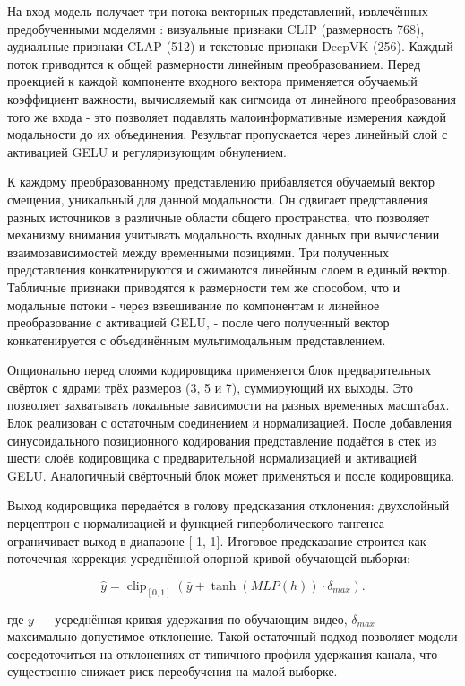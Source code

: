 \documentclass[times]{itmo-student-thesis}
\begin{document}
На вход модель получает три потока векторных представлений, извлечённых предобученными моделями \cite{radford2021clip,tong2022videomae,deepvk2024user}: визуальные признаки CLIP (размерность 768), аудиальные признаки CLAP (512) и текстовые признаки DeepVK (256). Каждый поток приводится к общей размерности  линейным преобразованием. Перед проекцией к каждой компоненте входного вектора применяется обучаемый коэффициент важности, вычисляемый как сигмоида от линейного преобразования того же входа - это позволяет подавлять малоинформативные измерения каждой модальности до их объединения. Результат пропускается через линейный слой с активацией GELU и регуляризующим обнулением.

К каждому преобразованному представлению прибавляется обучаемый вектор смещения, уникальный для данной модальности. Он сдвигает представления разных источников в различные области общего пространства, что позволяет механизму внимания учитывать модальность входных данных при вычислении взаимозависимостей между временными позициями. Три полученных представления конкатенируются и сжимаются линейным слоем в единый вектор. Табличные признаки приводятся к размерности  тем же способом, что и модальные потоки - через взвешивание по компонентам и линейное преобразование с активацией GELU, - после чего полученный вектор конкатенируется с объединённым мультимодальным представлением.

Опционально перед слоями кодировщика применяется блок предварительных свёрток с ядрами трёх размеров (3, 5 и 7), суммирующий их выходы. Это позволяет захватывать локальные зависимости на разных временных масштабах. Блок реализован с остаточным соединением и нормализацией. После добавления синусоидального позиционного кодирования представление подаётся в стек из шести слоёв кодировщика с предварительной нормализацией и активацией GELU. Аналогичный свёрточный блок может применяться и после кодировщика.

Выход кодировщика передаётся в голову предсказания отклонения: двухслойный перцептрон с нормализацией и функцией гиперболического тангенса ограничивает выход в диапазоне [-1, 1]. Итоговое предсказание строится как поточечная коррекция усреднённой опорной кривой обучающей выборки:

\[
\hat y=\operatorname{clip}_{[0,1]}\left(\bar y+\tanh(MLP(h))\cdot\delta_{max}\right).
\]

где $y$ — усреднённая кривая удержания по обучающим видео, $\delta_{max}$ — максимально допустимое отклонение. Такой остаточный подход позволяет модели сосредоточиться на отклонениях от типичного профиля удержания канала, что существенно снижает риск переобучения на малой выборке.
\end{document}
